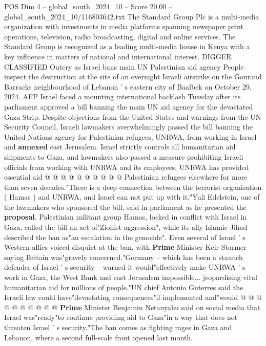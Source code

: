 \begin{textsample}{POS Dim 4 – global\_south\_2024\_10 – Score 20.00 – global\_south\_2024\_10/116803642.txt}  \label{ex:f4_pos_393}
The Standard Group Plc is a multi-media organization with investments in media platforms spanning newspaper print operations, television, radio broadcasting, digital and online services.
The Standard Group is recognized as a leading multi-media house in Kenya with a key influence in matters of national and international interest.
DIGGER CLASSIFIED Outcry as Israel bans main UN Palestinian aid agency People inspect the destruction at the site of an overnight Israeli airstrike on the Gouraud Barracks neighbourhood of Lebanon ' s eastern city of Baalbek on October 29, 2024.
AFP Israel faced a mounting international backlash Tuesday after its parliament approved a bill banning the main UN aid agency for the devastated Gaza Strip.
Despite objections from the United States and warnings from the UN Security Council, Israeli lawmakers overwhelmingly passed the bill banning the United Nations agency for Palestinian refugees, UNRWA, from working in Israel and \textbf{annexed} east Jerusalem.
Israel strictly controls all humanitarian aid shipments to Gaza, and lawmakers also passed a measure prohibiting Israeli officials from working with UNRWA and its employees.
UNRWA has provided essential aid @ @ @ @ @ @ @ @ @ @ Palestinian refugees elsewhere for more than seven decades."There is a deep connection between the terrorist organisation ( Hamas ) and UNRWA, and Israel can not put up with it,"Yuli Edelstein, one of the lawmakers who sponsored the bill, said in parliament as he presented the \textbf{proposal}.
Palestinian militant group Hamas, locked in conflict with Israel in Gaza, called the bill an act of"Zionist aggression", while its ally Islamic Jihad described the ban as"an escalation in the genocide".
Even several of Israel ' s Western allies voiced disquiet at the ban, with \textbf{Prime} Minister Keir Starmer saying Britain was"gravely concerned."Germany -- which has been a staunch defender of Israel ' s security -- warned it would"effectively make UNRWA ' s work in Gaza, the West Bank and east Jerusalem impossible... jeopardising vital humanitarian aid for millions of people."UN chief Antonio Guterres said the Israeli law could have"devastating consequences"if implemented and"would @ @ @ @ @ @ @ @ @ @ \textbf{Prime} Minister Benjamin Netanyahu said on social media that Israel was"ready"to continue providing aid to Gaza"in a way that does not threaten Israel ' s security."The ban comes as fighting rages in Gaza and Lebanon, where a second full-scale front opened last month.

\end{textsample}

